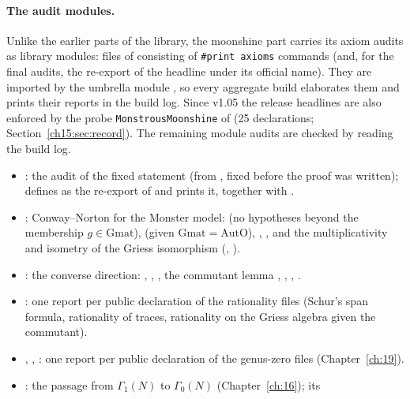 \paragraph{The audit modules.} Unlike the earlier parts of the library, the moonshine part carries its axiom audits as
library modules: files of  consisting of \texttt{\#print axioms} commands (and, for the final
audits, the re-export of the headline under its official name). They are imported by the umbrella module
, so every aggregate build elaborates them and prints their reports in the build log. Since
v1.05 the release headlines are also enforced by the probe \texttt{MonstrousMoonshine} of
 (25 declarations; Section~\ref{ch15:sec:record}). The remaining module
audits are checked by reading the build log.
\begin{itemize}
\item {}: the audit of the fixed statement 
  (from , fixed before the proof was written); defines  as
  the re-export of  and prints it, together with
  .
\item {}: Conway--Norton for the Monster model:  (no
  hypotheses beyond the membership $g\in\mathrm{Gmat}$),  (given $\mathrm{Gmat}=\mathrm{AutO}$), ,
  , and the multiplicativity and isometry of the Griess isomorphism (,
  ).
\item {}: the converse direction: ,
  , , the commutant lemma
  , , , .
\item {}: one report per public declaration of the rationality files (Schur's span formula,
  rationality of traces, rationality on the Griess algebra given the commutant).
\item {}, , : one report per
  public declaration of the genus-zero files (Chapter~\ref{ch:19}).
\item {}: the passage from $\Gamma_1(N)$ to $\Gamma_0(N)$ (Chapter~\ref{ch:16}); its

\end{itemize}
